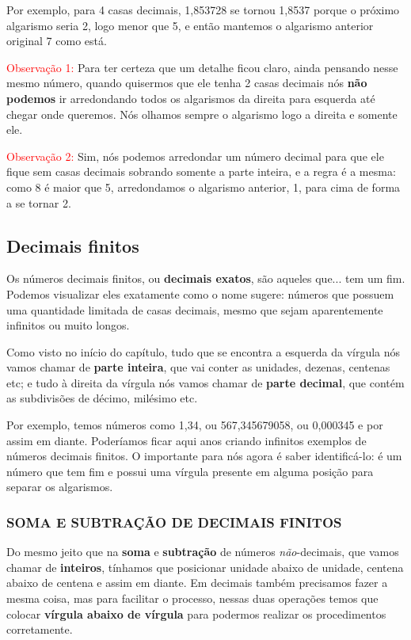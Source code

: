 Por exemplo, para 4 casas decimais, 1,853728 se tornou 1,8537 porque o próximo algarismo seria 2, logo menor que 5, e então mantemos o algarismo anterior original 7 como está.

\textcolor{red}{Observação 1:} Para ter certeza que um detalhe ficou claro, ainda pensando nesse mesmo número, quando quisermos que ele tenha 2 casas decimais nós \textbf{não podemos} ir arredondando todos os algarismos da direita para esquerda até chegar onde queremos. Nós olhamos sempre o algarismo logo a direita e somente ele.
    
\textcolor{red}{Observação 2:} Sim, nós podemos arredondar um número decimal para que ele fique sem casas decimais sobrando somente a parte inteira, e a regra é a mesma: como 8 é maior que 5, arredondamos o algarismo anterior, 1, para cima de forma a se tornar 2. 


\subsection{Decimais finitos}

Os números decimais finitos, ou \textbf{decimais exatos}, são aqueles que... tem um fim. Podemos visualizar eles exatamente como o nome sugere: números que possuem uma quantidade limitada de casas decimais, mesmo que sejam aparentemente infinitos ou muito longos. 

Como visto no início do capítulo, tudo que se encontra a esquerda da vírgula nós vamos chamar de \textbf{parte inteira}, que vai conter as unidades, dezenas, centenas etc; e tudo à direita da vírgula nós vamos chamar de \textbf{parte decimal}, que contém as subdivisões de décimo, milésimo etc.

Por exemplo, temos números como 1,34, ou 567,345679058, ou 0,000345 e por assim em diante. Poderíamos ficar aqui anos criando infinitos exemplos de números decimais finitos. O importante para nós agora é saber identificá-lo: é um número que tem fim e possui uma vírgula presente em alguma posição para separar os algarismos. 

\subsubsection{SOMA E SUBTRAÇÃO DE DECIMAIS FINITOS}

Do mesmo jeito que na \textbf{soma} e \textbf{subtração} de números \textit{não}-decimais, que vamos chamar de \textbf{inteiros}, tínhamos que posicionar unidade abaixo de unidade, centena abaixo de centena e assim em diante. Em decimais também precisamos fazer a mesma coisa, mas para facilitar o processo, nessas duas operações temos que colocar \textbf{vírgula abaixo de vírgula} para podermos realizar os procedimentos corretamente.

